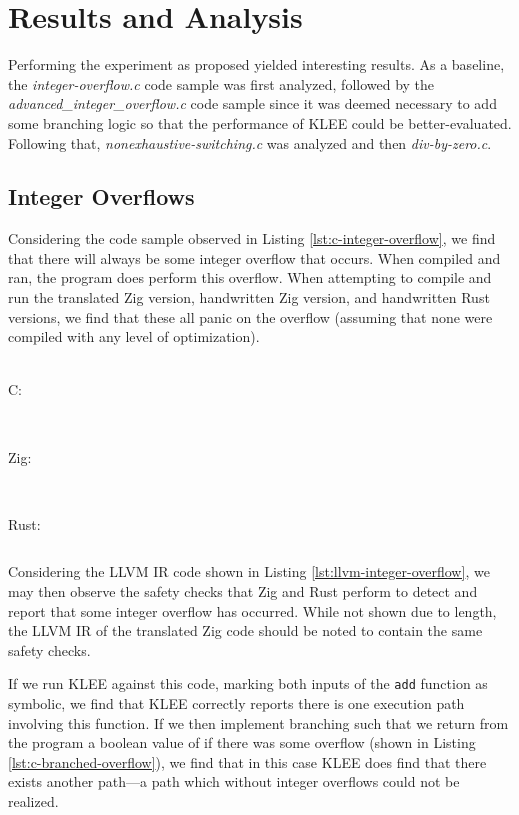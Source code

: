 \documentclass[conference]{IEEEtran}
\newenvironment{code}{\captionsetup{type=listing}}{}
\begin{document}
\section{Results and Analysis}
Performing the experiment as proposed yielded interesting results. As a baseline, the
\textit{integer-overflow.c} code sample was first analyzed, followed by the
\textit{advanced\_integer\_overflow.c} code sample since it was deemed necessary to
add some branching logic so that the performance of KLEE could be better-evaluated.
Following that, \textit{nonexhaustive-switching.c} was analyzed and then
\textit{div-by-zero.c}.


\subsection{Integer Overflows}
Considering the code sample observed in Listing \ref{lst:c-integer-overflow}, we find
that there will always be some integer overflow that occurs. When compiled and ran, the
program does perform this overflow. When attempting to compile and run the translated
Zig version, handwritten Zig version, and handwritten Rust versions, we find that these
all panic on the overflow (assuming that none were compiled with any level of
optimization).

\begin{code}
    \medskip
    \hrulefill\\
    C:
    \inputminted[firstline=6,lastline=19]{llvm}{../code-examples/c/integer-overflow.ll}
    \hrulefill\\
    Zig:
    \inputminted[firstline=148697,lastline=148718]{llvm}{../code-examples/zig/integer_overflow.ll}
    \hrulefill\\
    Rust:
    \inputminted[firstline=129,lastline=145]{llvm}{../code-examples/rust/integer_overflow.ll}
    \label{lst:llvm-integer-overflow}
    \medskip
\end{code}

Considering the LLVM IR code shown in Listing \ref{lst:llvm-integer-overflow}, we may
then observe the safety checks that Zig and Rust perform to detect and report that some
integer overflow has occurred. While not shown due to length, the LLVM IR of the translated
Zig code should be noted to contain the same safety checks.

If we run KLEE against this code, marking both inputs of the \texttt{add} function as symbolic,
we find that KLEE correctly reports there is one execution path involving this function. If we
then implement branching such that we return from the program a boolean value of if there was
some overflow (shown in Listing \ref{lst:c-branched-overflow}), we find that in this case KLEE
does find that there exists another path---a path which without integer overflows could not be
realized.
\end{document}
